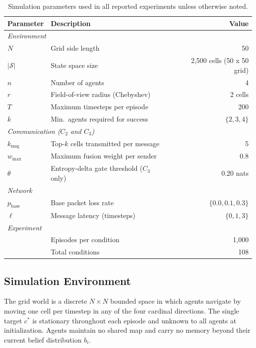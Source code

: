 \documentclass[pdflatex,sn-mathphys-num]{sn-jnl}%
\theoremstyle{thmstyleone}%
\theoremstyle{thmstyletwo}%
\theoremstyle{thmstylethree}%
\begin{document}
\begin{table}[t]
\centering
\caption{Simulation parameters used in all reported experiments unless
         otherwise noted.}
\label{tab:params}
\begin{tabular}{llr}
\toprule
Parameter & Description & Value \\
\midrule
\multicolumn{3}{l}{\textit{Environment}} \\
$N$               & Grid side length                    & 50           \\
$|\mathcal{S}|$   & State space size                    & 2{,}500 cells (50 x 50 grid) \\
$n$               & Number of agents                    & 4            \\
$r$               & Field-of-view radius (Chebyshev)    & 2 cells      \\
$T$               & Maximum timesteps per episode       & 200          \\
$k$               & Min.\ agents required for success   & $\{2, 3, 4\}$ \\
\midrule
\multicolumn{3}{l}{\textit{Communication ($C_2$ and $C_3$)}} \\
$k_{\text{msg}}$ & Top-$k$ cells transmitted per message & 5 \\
$w_{\max}$ & Maximum fusion weight per sender & 0.8 \\
$\theta$ & Entropy-delta gate threshold ($C_3$ only) & 0.20 nats \\
\midrule
\multicolumn{3}{l}{\textit{Network}} \\
$p_{\text{base}}$ & Base packet loss rate & $\{0.0, 0.1, 0.3\}$ \\
$\ell$ & Message latency (timesteps) & $\{0, 1, 3\}$ \\
\midrule
\multicolumn{3}{l}{\textit{Experiment}} \\
& Episodes per condition & 1,000 \\
& Total conditions & 108 \\
\bottomrule
\end{tabular}
\end{table}

\subsection{Simulation Environment}

The grid world is a discrete $N \times N$ bounded space in which agents navigate by moving one cell per timestep in any of the four cardinal directions. The single target $c^*$ is stationary throughout each episode and unknown to all agents at initialization. Agents maintain no shared map and carry no memory beyond their current belief distribution $b_i$.
\end{document}
